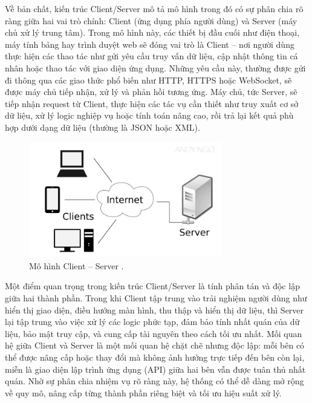     
      \hspace*{0.8cm}Về bản chất, kiến trúc Client/Server mô tả mô hình trong đó có sự phân chia rõ ràng giữa hai vai trò chính: Client (ứng dụng phía người dùng) và Server (máy chủ xử lý trung tâm). Trong mô hình này, các thiết bị đầu cuối như điện thoại, máy tính bảng hay trình duyệt web sẽ đóng vai trò là Client – nơi người dùng thực hiện các thao tác như gửi yêu cầu truy vấn dữ liệu, cập nhật thông tin cá nhân hoặc thao tác với giao diện ứng dụng. Những yêu cầu này, thường được gửi đi thông qua các giao thức phổ biến như HTTP, HTTPS hoặc WebSocket, sẽ được máy chủ tiếp nhận, xử lý và phản hồi tương ứng. Máy chủ, tức Server, sẽ tiếp nhận request từ Client, thực hiện các tác vụ cần thiết như truy xuất cơ sở dữ liệu, xử lý logic nghiệp vụ hoặc tính toán nâng cao, rồi trả lại kết quả phù hợp dưới dạng dữ liệu (thường là JSON hoặc XML).
    \vspace{0.5em}

\begin{figure}[H]
  \centering
  \includegraphics[width=0.75\textwidth]{images/client-server.jpg}
  \caption{Mô hình Client – Server \cite{codelearnClientServer}.}
  \label{fig:fig17}
\end{figure}

    
      \hspace*{0.8cm}Một điểm quan trọng trong kiến trúc Client/Server là tính phân tán và độc lập giữa hai thành phần. Trong khi Client tập trung vào trải nghiệm người dùng như hiển thị giao diện, điều hướng màn hình, thu thập và hiển thị dữ liệu, thì Server lại tập trung vào việc xử lý các logic phức tạp, đảm bảo tính nhất quán của dữ liệu, bảo mật truy cập, và cung cấp tài nguyên theo cách tối ưu nhất. Mối quan hệ giữa Client và Server là một mối quan hệ chặt chẽ nhưng độc lập: mỗi bên có thể được nâng cấp hoặc thay đổi mà không ảnh hưởng trực tiếp đến bên còn lại, miễn là giao diện lập trình ứng dụng (API) giữa hai bên vẫn được tuân thủ nhất quán. Nhờ sự phân chia nhiệm vụ rõ ràng này, hệ thống có thể dễ dàng mở rộng về quy mô, nâng cấp từng thành phần riêng biệt và tối ưu hiệu suất xử lý.
    \vspace{0.5em}

